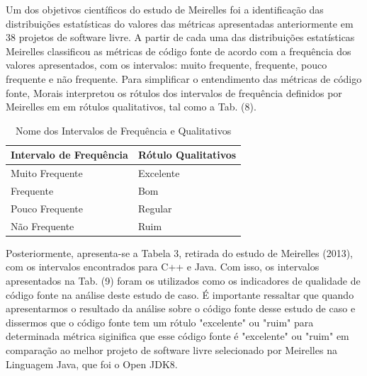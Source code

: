  \vspace{\onelineskip} 

Um dos objetivos científicos do estudo de Meirelles foi a identificação das distribuições estatísticas do valores das métricas apresentadas anteriormente em 38 projetos
de software livre. A partir de cada uma das distribuições estatísticas Meirelles classificou as métricas de código fonte de acordo com a frequência dos valores apresentados,
com os intervalos: muito frequente, frequente, pouco frequente e não frequente. Para simplificar o entendimento das métricas de código fonte, Morais interpretou os rótulos dos
intervalos de frequência definidos por Meirelles em em rótulos qualitativos, tal como a Tab. (8). 

\begin{table}[!ht]
	\begin{center}
	 \begin{tabular}{|l|l|}
		\hline
		Intervalo de Frequência & Rótulo Qualitativos \\ \hline
		Muito Frequente & Excelente \\ \hline
		Frequente       & Bom       \\ \hline
		Pouco Frequente & Regular   \\ \hline
		Não Frequente   & Ruim      \\ \hline
		\end{tabular}
		\caption{Nome dos Intervalos de Frequência e Qualitativos}
		\label{nomes}
		\end{center}
		\end{table}


Posteriormente, apresenta-se a Tabela 3, retirada do
estudo de Meirelles (2013), com os intervalos encontrados para C++ e Java. Com isso, os intervalos apresentados na Tab. (9) foram os utilizados como os indicadores
de qualidade de código fonte na análise deste estudo de caso. É importante ressaltar que quando apresentarmos o resultado da análise sobre o código fonte desse estudo de caso e dissermos que o código fonte tem um rótulo "excelente" ou "ruim" para determinada métrica siginifica que esse código fonte é "excelente" ou "ruim" em comparação ao melhor projeto de software livre selecionado por Meirelles na Linguagem Java, que foi o Open JDK8.

 \vspace{\onelineskip} 
 \vspace{\onelineskip} 
 \vspace{\onelineskip} 
 \vspace{\onelineskip} 
 \vspace{\onelineskip} 

